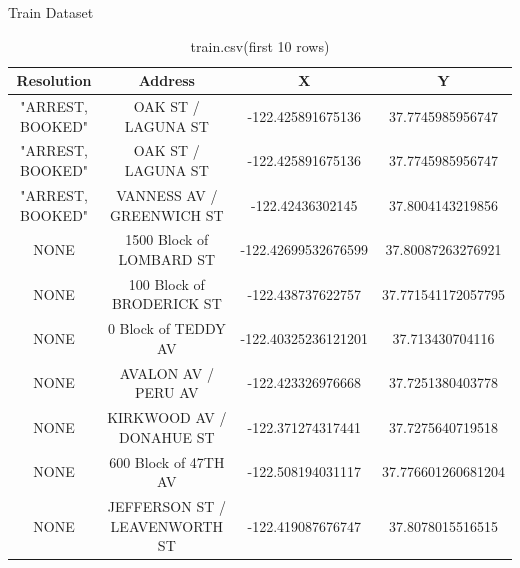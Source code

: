 \documentclass[11pt]{beamer}
\begin{document}
\begin{frame}{Train Dataset}
\begin{table}[htbp]
\begin{tabular}{cccc|}\hline
Resolution&Address&X&Y\\\hline\hline
"ARREST, BOOKED"&OAK ST / LAGUNA ST&-122.425891675136&37.7745985956747\\
"ARREST, BOOKED"&OAK ST / LAGUNA ST&-122.425891675136&37.7745985956747\\
"ARREST, BOOKED"&VANNESS AV / GREENWICH ST&-122.42436302145&37.8004143219856\\
NONE&1500 Block of LOMBARD ST&-122.42699532676599&37.80087263276921\\
NONE&100 Block of BRODERICK ST&-122.438737622757&37.771541172057795\\
NONE&0 Block of TEDDY AV&-122.40325236121201&37.713430704116\\
NONE&AVALON AV / PERU AV&-122.423326976668&37.7251380403778\\
NONE&KIRKWOOD AV / DONAHUE ST&-122.371274317441&37.7275640719518\\
NONE&600 Block of 47TH AV&-122.508194031117&37.776601260681204\\
NONE&JEFFERSON ST / LEAVENWORTH ST&-122.419087676747&37.8078015516515\\\hline
\end{tabular}
\caption{train.csv(first 10 rows)}
\label{tab:train.csv}
\end{table}
\end{frame}
\end{document}
